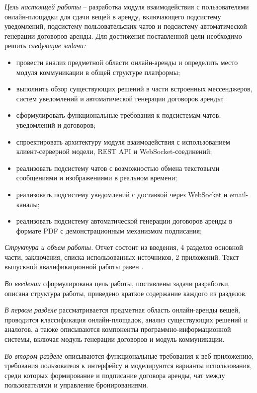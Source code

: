 \emph{Цель настоящей работы} – разработка модуля взаимодействия с пользователями онлайн-площадки для сдачи вещей в аренду, включающего подсистему уведомлений, подсистему пользовательских чатов и подсистему автоматической генерации договоров аренды. Для достижения поставленной цели необходимо решить \emph{следующие задачи:}
\begin{itemize}
\item провести анализ предметной области онлайн-аренды и определить место модуля коммуникации в общей структуре платформы;
\item выполнить обзор существующих решений в части встроенных мессенджеров, систем уведомлений и автоматической генерации договоров аренды;
\item сформулировать функциональные требования к подсистемам чатов, уведомлений и договоров;
\item спроектировать архитектуру модуля взаимодействия с использованием клиент-серверной модели, REST API и WebSocket-соединений;
\item реализовать подсистему чатов с возможностью обмена текстовыми сообщениями и изображениями в реальном времени;
\item реализовать подсистему уведомлений с доставкой через WebSocket и email-каналы;
\item реализовать подсистему автоматической генерации договоров аренды в формате PDF с демонстрационным механизмом подписания;
\end{itemize}

\emph{Структура и объем работы.} Отчет состоит из введения, 4 разделов основной части, заключения, списка использованных источников, 2 приложений. Текст выпускной квалификационной работы равен .

\emph{Во введении} сформулирована цель работы, поставлены задачи разработки, описана структура работы, приведено краткое содержание каждого из разделов.

\emph{В первом разделе} рассматривается предметная область онлайн-аренды вещей, проводится классификация онлайн-площадок, анализ существующих решений и аналогов, а также описываются компоненты программно-информационной системы, включая модуль генерации договоров и модуль коммуникации.

\emph{Во втором разделе} описываются функциональные требования к веб-приложению, требования пользователя к интерфейсу и моделируются варианты использования, среди которых формирование и подписание договора аренды, чат между пользователями и управление бронированиями.

